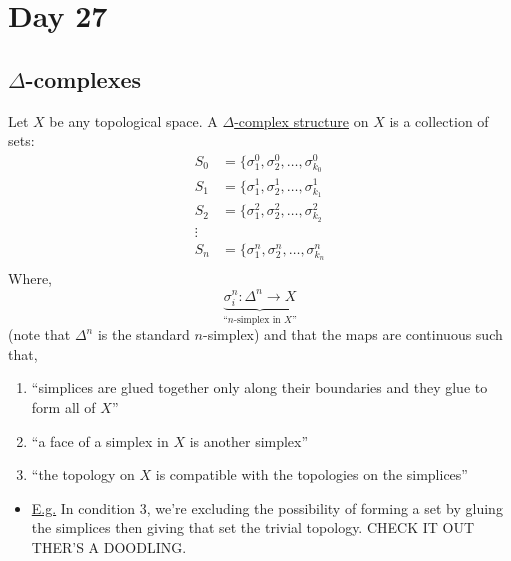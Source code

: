 \documentclass[../notes.tex]{subfiles}
\begin{document}
\section{Day 27}
\subsection{$\Delta$-complexes}
\begin{definition}
    Let $X$ be any topological space.
    A \underline{$\Delta$-complex structure} on $X$ is a collection of sets:
    \begin{align*}
        S_0&=\{\sigma_1^0,\sigma_2^0,\dots,\sigma_{k_0}^0\\
        S_1&=\{\sigma_1^1,\sigma_2^1,\dots,\sigma_{k_1}^1\\
        S_2&=\{\sigma_1^2,\sigma_2^2,\dots,\sigma_{k_2}^2\\
        \vdots&\\
        S_n&=\{\sigma_1^n,\sigma_2^n,\dots,\sigma_{k_n}^n\\
    \end{align*}
    Where,
    \[
        \underbrace{\sigma_i^n:\Delta^n\rightarrow X}_{
            \text{``$n$-simplex in $X$''}
        }
    \]
    (note that $\Delta^n$ is the standard $n$-simplex)
    and that the maps are continuous such that,
    \begin{enumerate}
        \item ``simplices are glued together only along their boundaries and they glue to form all of $X$''
        \item ``a face of a simplex in $X$ is another simplex''
        \item ``the topology on $X$ is compatible with the topologies on the simplices''
    \end{enumerate}
    \begin{itemize}
        \item \underline{E.g.} In condition 3, we're excluding the possibility of forming
            a set by gluing the simplices then giving that set the trivial topology. CHECK
            IT OUT THER'S A DOODLING.
    \end{itemize}
    \end{definition}
\end{document}
